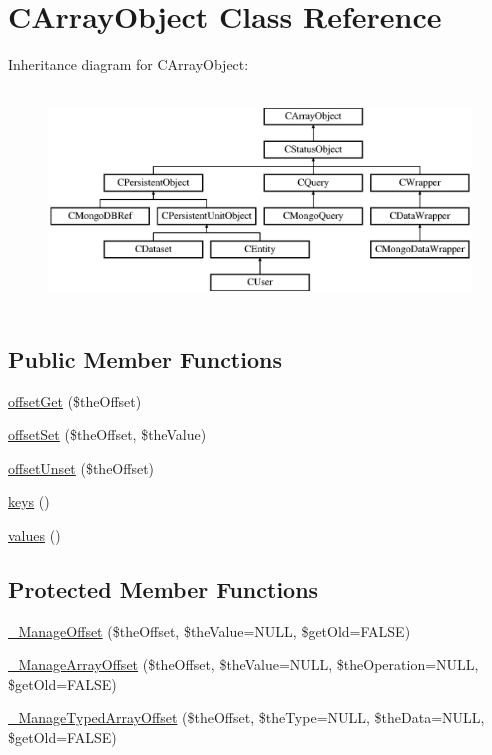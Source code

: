 \hypertarget{class_c_array_object}{\section{C\-Array\-Object Class Reference}
\label{class_c_array_object}
}
Inheritance diagram for C\-Array\-Object\-:\begin{figure}[H]
\begin{center}
\leavevmode
\includegraphics[height=5.874125cm]{class_c_array_object}
\end{center}
\end{figure}
\subsection*{Public Member Functions}
\begin{DoxyCompactItemize}
\item 
\hyperlink{class_c_array_object_ac9929feeb67c76a0e055696abffe2fb6}{offset\-Get} (\$the\-Offset)
\item 
\hyperlink{class_c_array_object_a41815b543b14d373f68ed34ca53dc9f6}{offset\-Set} (\$the\-Offset, \$the\-Value)
\item 
\hyperlink{class_c_array_object_a2852b78f58379e507b5e7d7cb8e5326b}{offset\-Unset} (\$the\-Offset)
\item 
\hyperlink{class_c_array_object_a350d95184af98e75868f27ea170270ce}{keys} ()
\item 
\hyperlink{class_c_array_object_a1f29fcc343a624354f6096fd6a4621e6}{values} ()
\end{DoxyCompactItemize}
\subsection*{Protected Member Functions}
\begin{DoxyCompactItemize}
\item 
\hyperlink{class_c_array_object_a931cb8b30569b811a18adc0161eb3603}{\-\_\-\-Manage\-Offset} (\$the\-Offset, \$the\-Value=N\-U\-L\-L, \$get\-Old=F\-A\-L\-S\-E)
\item 
\hyperlink{class_c_array_object_a056b7a3218ffb9a2eb992c029124a669}{\-\_\-\-Manage\-Array\-Offset} (\$the\-Offset, \$the\-Value=N\-U\-L\-L, \$the\-Operation=N\-U\-L\-L, \$get\-Old=F\-A\-L\-S\-E)
\item 
\hyperlink{class_c_array_object_af714f81bb75f725c6868fb286c59b160}{\-\_\-\-Manage\-Typed\-Array\-Offset} (\$the\-Offset, \$the\-Type=N\-U\-L\-L, \$the\-Data=N\-U\-L\-L, \$get\-Old=F\-A\-L\-S\-E)
\end{DoxyCompactItemize}


